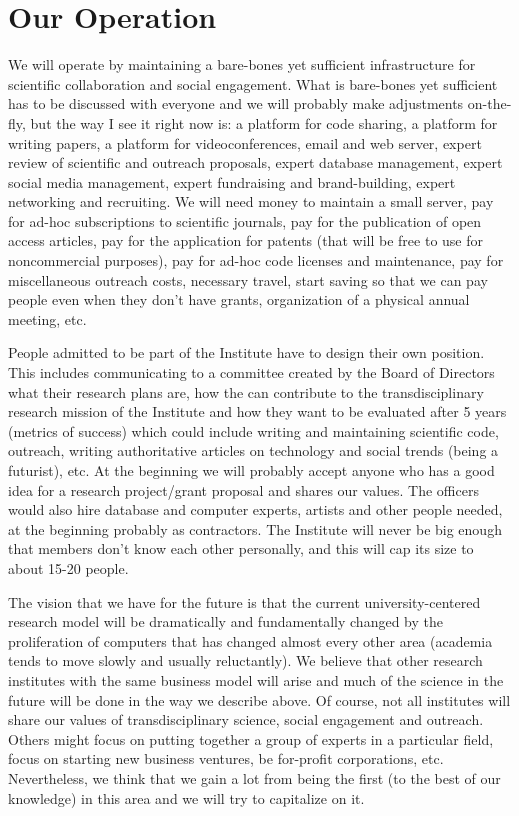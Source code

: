 \section{Our Operation}

We will operate by maintaining a bare-bones yet sufficient infrastructure for scientific collaboration and social engagement. What is bare-bones yet sufficient has to be discussed with everyone and we will probably make adjustments on-the-fly, but the way I see it right now is: a platform for code sharing, a platform for writing papers, a platform for videoconferences, email and web server, expert review of scientific and outreach proposals, expert database management, expert social media management, expert fundraising and brand-building, expert networking and recruiting. We will need money to maintain a small server, pay for ad-hoc subscriptions to scientific journals, pay for the publication of open access articles, pay for the application for patents (that will be free to use for noncommercial purposes), pay for ad-hoc code licenses and maintenance, pay for miscellaneous outreach costs, necessary travel, start saving so that we can pay people even when they don't have grants, organization of a physical annual meeting, etc. 

People admitted to be part of the Institute have to design their own position. This includes communicating to a committee created by the Board of Directors what their research plans are, how the can contribute to the transdisciplinary research mission of the Institute and how they want to be evaluated after 5 years (metrics of success) which could include writing and maintaining scientific code, outreach, writing authoritative articles on technology and social trends (being a futurist), etc. At the beginning we will probably accept anyone who has a good idea for a research project/grant proposal and shares our values. The officers would also hire database and computer experts, artists and other people needed, at the beginning probably as contractors. The Institute will never be big enough that members don't know each other personally, and this will cap its size to about 15-20 people.

The vision that we have for the future is that the current university-centered research model will be dramatically and fundamentally changed by the proliferation of computers that has changed almost every other area (academia tends to move slowly and usually reluctantly). We believe that other research institutes with the same business model will arise and much of the science in the future will be done in the way we describe above. Of course, not all institutes will share our values of transdisciplinary science, social engagement and outreach. Others might focus on putting together a group of experts in a particular field, focus on starting new business ventures, be for-profit corporations, etc. Nevertheless, we think that we gain a lot from being the first (to the best of our knowledge) in this area and we will try to capitalize on it.
